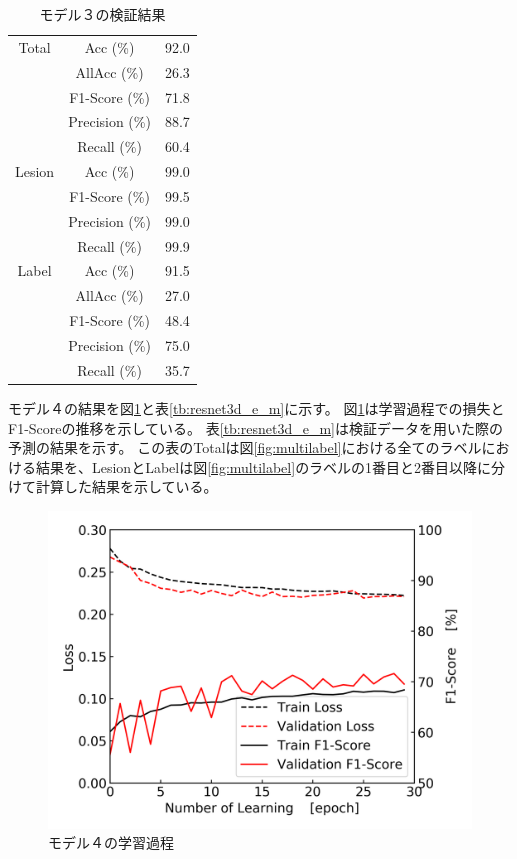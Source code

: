 \begin{table}[tb]
    \caption[]{モデル３の検証結果}
    \label{tb:resnet3d_m}
    \centering
    \normalsize
    \begin{tabular}{c|c|r} \hline
        Total & Acc (\%) & 92.0 \\ \cline{2-3}
         & AllAcc (\%) & 26.3 \\ \cline{2-3}
         & F1-Score (\%) & 71.8 \\ \cline{2-3}
         & Precision (\%) & 88.7 \\ \cline{2-3}
         & Recall (\%) & 60.4 \\ \hline
        Lesion & Acc (\%) & 99.0 \\ \cline{2-3}
         & F1-Score (\%) & 99.5 \\ \cline{2-3}
         & Precision (\%) & 99.0 \\ \cline{2-3}
         & Recall (\%) & 99.9 \\ \hline
        Label & Acc (\%) & 91.5 \\ \cline{2-3}
         & AllAcc (\%) & 27.0 \\ \cline{2-3}
         & F1-Score (\%) & 48.4 \\ \cline{2-3}
         & Precision (\%) & 75.0 \\ \cline{2-3}
         & Recall (\%) & 35.7 \\ \hline
    \end{tabular}
\end{table}

\newpage
モデル４の結果を図\ref{fig:resnet3d_e_m_result_process}と表\ref{tb:resnet3d_e_m}に示す。
図\ref{fig:resnet3d_e_m_result_process}は学習過程での損失とF1-Scoreの推移を示している。
表\ref{tb:resnet3d_e_m}は検証データを用いた際の予測の結果を示す。
この表のTotalは図\ref{fig:multilabel}における全てのラベルにおける結果を、LesionとLabelは図\ref{fig:multilabel}のラベルの1番目と2番目以降に分けて計算した結果を示している。

\begin{figure}[htbp]
    \begin{center}
        \includegraphics[width=150mm]{./fig/resnet3d_e_mprocess.png}
        \caption{モデル４の学習過程}
        \label{fig:resnet3d_e_m_result_process}
    \end{center}
\end{figure}

